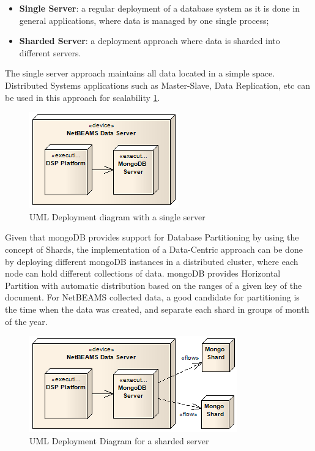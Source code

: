 \begin{itemize}
  \item \textbf{Single Server}: a regular deployment of a database system as it
  is done in general applications, where data is managed by one single process;
  \item \textbf{Sharded Server}: a deployment approach where data is sharded
  into different servers.
\end{itemize} 

The single server approach maintains all data located in a simple space.
Distributed Systems applications such as Master-Slave, Data Replication, etc
can be used in this approach for scalability
\ref{fig:DSP-Data-Persistence-Deployment-Single}. 

\begin{figure}[!h]
  \centering
  \includegraphics[scale=0.7]{../diagrams/DSP-Data-Persistence-Deployment-Single}
  \caption{UML Deployment diagram with a single server}
  \label{fig:DSP-Data-Persistence-Deployment-Single}
\end{figure}

Given that mongoDB provides support for Database Partitioning by using
the concept of Shards, the implementation of a Data-Centric approach can be done
by deploying different mongoDB instances in a distributed cluster, where each
node can hold different collections of data. mongoDB provides Horizontal
Partition with automatic distribution based on the ranges of a given key of
the document. For NetBEAMS collected data, a good candidate for partitioning is
the time when the data was created, and separate each shard in groups of month
of the year.

\begin{figure}[!h]
  \centering
  \includegraphics[scale=0.7]{../diagrams/DSP-Data-Persistence-Deployment-Sharded}
  \caption{UML Deployment Diagram for a sharded server}
  \label{fig:DSP-Data-Persistence-Deployment-Sharded}
\end{figure}

